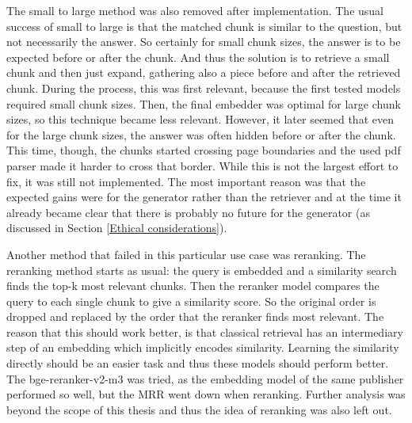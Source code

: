 The small to large method was also removed after implementation. The usual success of small to large is that the matched chunk is similar to the question, but not necessarily the answer. So certainly for small chunk sizes, the answer is to be expected before or after the chunk. And thus the solution is to retrieve a small chunk and then just expand, gathering also a piece before and after the retrieved chunk. During the process, this was first relevant, because the first tested models required small chunk sizes. Then, the final embedder was optimal for large chunk sizes, so this technique became less relevant. However, it later seemed that even for the large chunk sizes, the answer was often hidden before or after the chunk. This time, though, the chunks started crossing page boundaries and the used pdf parser made it harder to cross that border. While this is not the largest effort to fix, it was still not implemented. The most important reason was that the expected gains were for the generator rather than the retriever and at the time it already became clear that there is probably no future for the generator (as discussed in Section \ref{Ethical considerations}).

Another method that failed in this particular use case was reranking. The reranking method starts as usual: the query is embedded and a similarity search finds the top-k most relevant chunks. Then the reranker model compares the query to each single chunk to give a similarity score. So the original order is dropped and replaced by the order that the reranker finds most relevant. The reason that this should work better, is that classical retrieval has an intermediary step of an embedding which implicitly encodes similarity. Learning the similarity directly should be an easier task and thus these models should perform better. The bge-reranker-v2-m3 was tried, as the embedding model of the same publisher performed so well, but the MRR went down when reranking. Further analysis was beyond the scope of this thesis and thus the idea of reranking was also left out.

